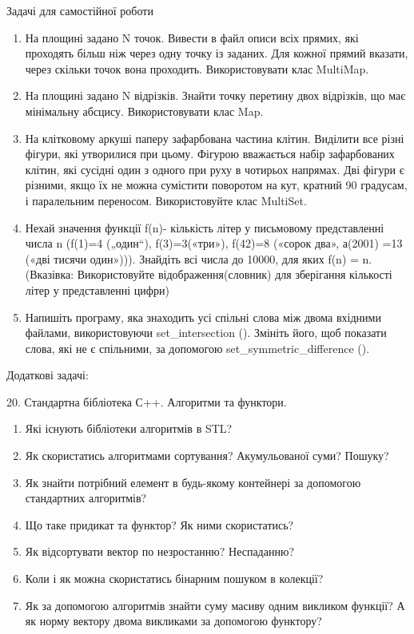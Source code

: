 \documentclass[]{article}
\makeatletter
\newcommand{\xslalph}[1]{\expandafter\@xslalph\csname c@#1\endcsname}
\newcommand{\@xslalph}[1]{%
    \ifcase#1\or а\or б\or в\or г\or д\or e\or є\or ж\or з\or i%
    \or й\or к\or л\or м\or н\or о\or п\or р\or с\or т%
    \or у\or ф\or х\or ц\or ч\or ш\or ю\or я\or аа\or бб\or вв%
    \else\@ctrerr\fi%
}
\makeatother
\begin{document}
\begin{enumerate}
\begin{enumerate}[label=\xslalph*)]
\begin{enumerate}
\begin{enumerate}[label=\xslalph*)]
\begin{enumerate}
\begin{enumerate}[label=\xslalph*)]
\begin{enumerate}
\begin{enumerate}[label=\xslalph*)]
Задачі для самостійної роботи

\begin{enumerate}
\def\labelenumi{\arabic{enumi})}
\item
  На площині задано N точок. Вивести в файл описи всіх прямих, які
  проходять більш ніж через одну точку із заданих. Для кожної прямий
  вказати, через скільки точок вона проходить. Використовувати клас
  MultiMap.
\item
  На площині задано N відрізків. Знайти точку перетину двох відрізків,
  що має мінімальну абсцису. Використовувати клас Map.
\item
  На клітковому аркуші паперу зафарбована частина клітин. Виділити все
  різні фігури, які утворилися при цьому. Фігурою вважається набір
  зафарбованих клітин, які сусідні один з одного при руху в чотирьох
  напрямах. Дві фігури є різними, якщо їх не можна сумістити поворотом
  на кут, кратний 90 градусам, і паралельним переносом. Використовуйте
  клас MultiSet.
\item
  Нехай значення функції f(n)- кількість літер у письмовому
  представленні числа n (f(1)=4 („один``), f(3)=3(«три»), f(42)=8
  («сорок два», а(2001) =13 («дві тисячи один»))). Знайдіть всі числа до
  10000, для яких f(n) = n. (Вказівка: Використовуйте
  відображення(словник) для зберігання кількості літер у представленні
  цифри)
\item
  Напишіть програму, яка знаходить усі спільні слова між двома вхідними
  файлами, використовуючи set\_intersection (). Змініть його, щоб
  показати слова, які не є спільними, за допомогою
  set\_symmetric\_difference ().
\end{enumerate}

Додаткові задачі:

20. Стандартна бібліотека С++. Алгоритми та функтори.

\begin{enumerate}
\def\labelenumi{\arabic{enumi})}
\item
  Які існують бібліотеки алгоритмів в STL?
\item
  Як скористатись алгоритмами сортування? Акумульованої суми? Пошуку?
\item
  Як знайти потрібний елемент в будь-якому контейнері за допомогою
  стандартних алгоритмів?
\item
  Що таке придикат та функтор? Як ними скористатись?
\item
  Як відсортувати вектор по незростанню? Неспаданню?
\item
  Коли і як можна скористатись бінарним пошуком в колекції?
\item
  Як за допомогою алгоритмів знайти суму масиву одним викликом функції?
  А як норму вектору двома викликами за допомогою функтору?
\end{enumerate}


\end{enumerate}
\end{enumerate}
\end{enumerate}
\end{enumerate}
\end{enumerate}
\end{enumerate}
\end{enumerate}
\end{enumerate}
\end{document}
